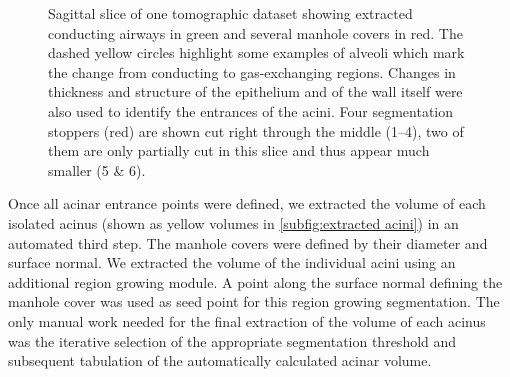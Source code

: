 \documentclass[a4paper,DIV=calc,abstract,english]{scrartcl}
\newlength\imagescale		%
\begin{document}
\begin{figure}[!h]
%
	\caption{Sagittal slice of one tomographic dataset showing extracted conducting airways in green and several manhole covers in red.
		The dashed yellow circles highlight some examples of alveoli which mark the change from conducting to gas-exchanging regions.
		Changes in thickness and structure of the epithelium and of the wall itself were also used to identify the entrances of the acini.
		Four segmentation stoppers (red) are shown cut right through the middle (\numrange{1}{4}), two of them are only partially cut in this slice and thus appear much smaller (5 \& 6).}
	\label{fig:ManholeCoverExplanation}
\end{figure}

Once all acinar entrance points were defined, we extracted the volume of each isolated acinus (shown as yellow volumes in \autoref{subfig:extracted acini}) in an automated third step.
The manhole covers were defined by their diameter and surface normal.
We extracted the volume of the individual acini using an additional region growing module.
A point along the surface normal defining the manhole cover was used as seed point for this region growing segmentation.
The only manual work needed for the final extraction of the volume of each acinus was the iterative selection of the appropriate segmentation threshold and subsequent tabulation of the automatically calculated acinar volume.
\end{document}
